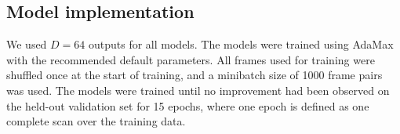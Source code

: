 

\subsection{Model implementation}
We used $D = 64$ outputs for all models.
The models were trained using AdaMax \parencite{kingma2014adam} with the recommended default parameters. %
All frames used for training were shuffled once at the start of training, and a minibatch size of 1000 frame pairs was used.
The models were trained until no improvement had been observed on the held-out validation set for 15 epochs, where one epoch is defined as one complete scan over the training data.

